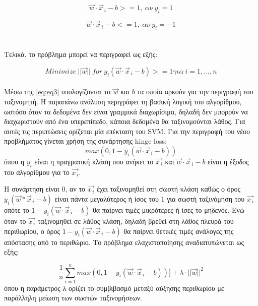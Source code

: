 \begin{equation} \label{eq:eq1}
\vec{w}\cdot \vec{x}_{\,i} - b >= 1, ~αν ~y_{i} = 1
\end{equation}


\begin{equation} \label{eq:eq2}
\vec{w} \cdot \vec{x}_{\,i} - b <= 1, ~αν ~y_{i} = -1
\end{equation}
\\
\\
Τελικά, το πρόβλημα μπορεί να περιγραφεί ως εξής:


\begin{equation} \label{eq:eq3}
Minimize~||\vec{w}|| ~ for ~ y_{i}(\vec{w}\cdot \vec{x}_{\,i} - b)>= 1 για ~ i = 1,...,n
\end{equation}
\\


Μέσω της \ref{eq:eq3} υπολογίζονται τα $\vec{w}$ και $b$ τα οποία αρκούν για την περιγραφή του ταξινομητή. Η παραπάνω ανάλυση περιγράφει τη βασική λογική του αλγορίθμου, ωστόσο όταν τα δεδομένα δεν είναι γραμμικά διαχωρίσιμα, δηλαδή δεν μπορούν να διαχωριστούν από ένα υπερεπίπεδο, κάποια δεδομένα θα ταξινομούνται λάθος. Για αυτές τις περιπτώσεις ορίζεται μία επέκταση του SVM. Για την περιγραφή του νέου προβλήματος γίνεται χρήση της συνάρτησης hinge loss:
\\


\begin{equation} \label{eq:eq4}
max(0,1-y_{i}(\vec{w} \cdot \vec{x}_{\,i} - b))
\end{equation}
όπου η $ y_{i}$ είναι η πραγματική κλάση που ανήκει το $\vec{x_{\,i}}$ και $\vec{w} \cdot \vec{x}_{\,i}-b$ είναι η έξοδος του αλγορίθμου για το $\vec{x_{\,i}}$.


Η συνάρτηση είναι $0$, αν το $\vec{x_{\,i}}$ έχει ταξινομηθεί στη σωστή κλάση καθώς ο όρος $y_{i}(\vec{w}*\vec{x}_{\,i}-b)$ είναι πάντα μεγαλύτερος ή ίσος του 1 για σωστή ταξινόμηση του $\vec{x_{\,i}}$ οπότε το $1-y_{i}(\vec{w} \cdot \vec{x}_{\,i}-b)$ θα παίρνει τιμές μικρότερες ή ίσες το μηδενός. Ενώ όταν το $\vec{x_{\,i}}$ ταξινομηθεί σε λάθος κλάση, δηλαδή βρεθεί στη λάθος πλευρά του περιθωρίου,
 ο όρος $1-y_{i}(\vec{w} \cdot \vec{x}_{\,i}-b)$ θα παίρνει θετικές τιμές ανάλογες της απόστασης από το περιθώριο. Το πρόβλημα ελαχιστοποίησης  αναδιατυπώνεται ως εξής:


\begin{equation} \label{eq:eq5}
\frac{1}{n}  \sum_{i=1}^{n} max(0,1-y_{i}(\vec{w} \cdot \vec{x}_{\,i} - b))] + \lambda \cdot  ||\vec{w}||^2
\end{equation}
όπου η παράμετρος λ ορίζει το συμβιβασμό μεταξύ αύξησης περιθωρίου με παράλληλη μείωση των σωστών ταξινομήσεων.



